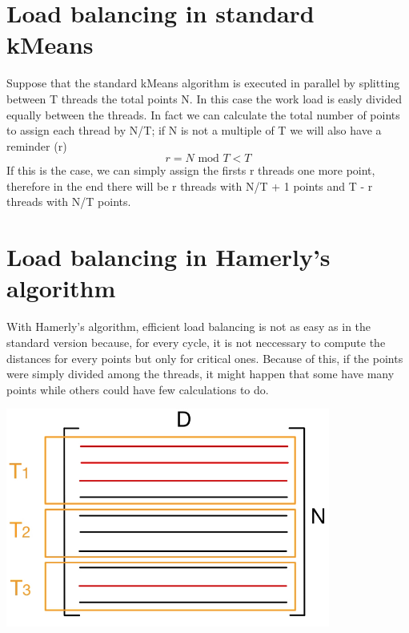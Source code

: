 \documentclass{report}
\begin{document}
  \begin{minipage}[b]{0.48\textwidth}
    \section*{Load balancing in standard kMeans}
    Suppose that the standard kMeans algorithm is executed in parallel by splitting between T threads the total points N. In this case the work load is easly divided equally between the threads. In fact we can calculate the total number of points to assign each thread by N/T; if N is not a multiple of T we will also have a reminder (r)
    \begin{equation}
      r = N \text{ mod } T < T
    \end{equation}
    If this is the case, we can simply assign the firsts r threads one more point, therefore in the end there will be r threads with N/T + 1 points and T - r threads with N/T points.

    \section*{Load balancing in Hamerly's algorithm}
    With Hamerly's algorithm, efficient load balancing is not as easy as in the standard version because, for every cycle, it is not neccessary to compute the distances for every points but only for critical ones. Because of this, if the points were simply divided among the threads, it might happen that some have many points while others could have few calculations to do.

    \begin{center}
      \includegraphics[width = 0.8\textwidth]{imgs/non_balances_hamerly.png}
      \label{fig:non_bal_ham}
    \end{center}


\end{minipage}
\end{document}
